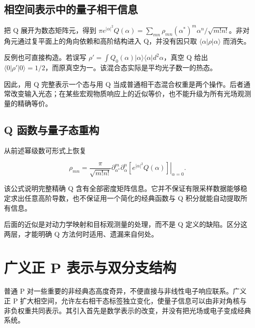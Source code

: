 \documentclass[UTF8,a4paper,zihao=-4,openany,fontset=fandol]{ctexbook}
\begin{document}
\section{相空间表示中的量子相干信息}\label{sec:09:10}


把 Q 展开为数态矩阵元，得到 $\pi e^{|\alpha|^2}Q(\alpha)=\sum_{mn}\rho_{mn}(\alpha^*)^m\alpha^n/\sqrt{m!n!}$。非对角元通过复平面上的角向依赖和高阶结构进入 Q，并没有因只取 $\langle\alpha|\rho|\alpha\rangle$ 而消失。



反例也可直接构造。若误写 $\rho'=\int Q_0(\alpha)|\alpha\rangle\langle\alpha|d^2\alpha$，真空 Q 给出 $\langle0|\rho'|0\rangle=1/2$，而原真空为一。该混合态实际是平均光子数一的热态。



因此，用 Q 完整表示一个态与用 Q 当成普通相干态混合权重是两个操作。后者通常改变输入光态；在某些宏观物质响应上的近似等价，也不能升级为所有光场观测量的精确等价。



\section{Q 函数与量子态重构}\label{sec:09:11}


从前述幂级数可形式上恢复



\begin{equation*}
\rho_{mn}=\frac{\pi}{\sqrt{m!n!}}
\left.\partial_{\alpha^*}^{m}\partial_\alpha^n
\left[e^{|\alpha|^2}Q(\alpha)\right]\right|_{\alpha=0}.
\tag{9.12}\label{eq:9.12}
\end{equation*}


该公式说明完整精确 Q 含有全部密度矩阵信息。它并不保证有限采样数据能够稳定求出任意高阶导数，也不保证用一个简化的经典函数与 Q 积分就能自动提取所有信息。



后面的近似是对动力学映射和目标观测量的处理，而不是 Q 定义的缺陷。区分这两层，才能明确 Q 方法何时适用、遗漏来自何处。



\chapter{广义正 P 表示与双分支结构}\label{ch:10}


普通 P 对一些重要的非经典态高度奇异，不便直接与非线性电子响应联系。广义正 P 扩大相空间，允许左右相干态标签独立变化，使量子信息可以由非对角核与非负权重共同表示。其引入首先是数学表示的改变，并没有把光场或电子变成经典系统。
\end{document}
